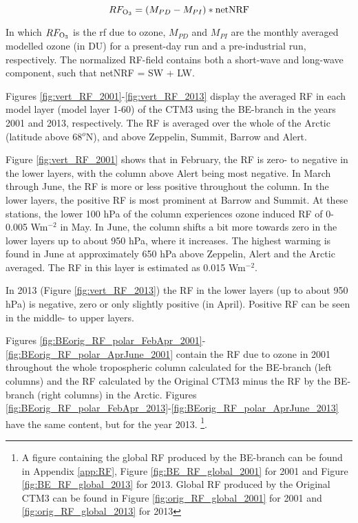 \begin{equation}
    RF_{\mathrm{O_3}} = (M_{PD} - M_{PI})*\text{netNRF}
    \label{eqn:RF}
\end{equation}

In which $RF_{\mathrm{O_3}}$ is the \acrshort{rf} due to ozone, $M_{PD}$ and $M_{PI}$ are the monthly averaged modelled ozone (in DU) for a present-day run and a pre-industrial run, respectively. The normalized RF-field contains both a short-wave and long-wave component, such that netNRF = SW + LW.

\medskip

Figures \ref{fig:vert_RF_2001}-\ref{fig:vert_RF_2013} display the averaged RF in each model layer (model layer 1-60) of the CTM3 using the BE-branch in the years 2001 and 2013, respectively. The RF is averaged over the whole of the Arctic (latitude above 68$^o$N), and above Zeppelin, Summit, Barrow and Alert. 

\medskip

Figure \ref{fig:vert_RF_2001} shows that in February, the RF is zero- to negative in the lower layers, with the column above Alert being most negative. In March through June, the RF is more or less positive throughout the column. In the lower layers, the positive RF is most prominent at Barrow and Summit. At these stations, the lower 100 hPa of the column experiences ozone induced RF of 0-0.005 Wm$^{-2}$ in May. In June, the column shifts a bit more towards zero in the lower layers up to about 950 hPa, where it increases. The highest warming is found in June at approximately 650 hPa above Zeppelin, Alert and the Arctic averaged. The RF in this layer is estimated as 0.015 Wm$^{-2}$. 


\medskip

In 2013 (Figure \ref{fig:vert_RF_2013}) the RF in the lower layers (up to about 950 hPa) is negative, zero or only slightly positive (in April). Positive RF can be seen in the middle- to upper layers. 




\medskip


Figures \ref{fig:BEorig_RF_polar_FebApr_2001}-\ref{fig:BEorig_RF_polar_AprJune_2001} contain the RF due to ozone in 2001 throughout the whole tropospheric column calculated for the BE-branch (left columns) and the RF calculated by the Original CTM3 minus the RF by the BE-branch (right columns) in the Arctic. Figures \ref{fig:BEorig_RF_polar_FebApr_2013}-\ref{fig:BEorig_RF_polar_AprJune_2013} have the same content, but for the year 2013. \footnote{A figure containing the global RF produced by the BE-branch can be found in Appendix \ref{app:RF}, Figure \ref{fig:BE_RF_global_2001} for 2001 and Figure \ref{fig:BE_RF_global_2013} for 2013. Global RF produced by the Original CTM3 can be found in Figure \ref{fig:orig_RF_global_2001} for 2001 and \ref{fig:orig_RF_global_2013} for 2013}. 
\medskip 

